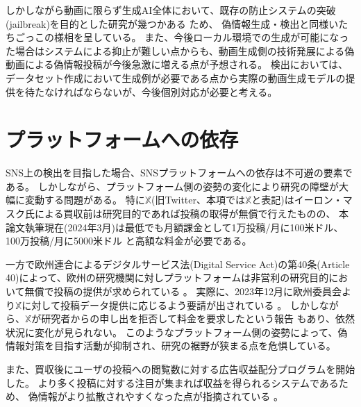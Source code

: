 しかしながら動画に限らず生成AI全体において、既存の防止システムの突破(jailbreak)を目的とした研究が幾つかある \cite{NEURIPS2023_fd661313,shayegani2024jailbreak}ため、
偽情報生成・検出と同様いたちごっこの様相を呈している。
また、今後ローカル環境での生成が可能になった場合はシステムによる抑止が難しい点からも、動画生成側の技術発展による偽動画による偽情報投稿が今後急激に増える点が予想される。
検出においては、データセット作成において生成例が必要である点から実際の動画生成モデルの提供を待たなければならないが、今後個別対応が必要と考える。

\section{プラットフォームへの依存}
SNS上の検出を目指した場合、SNSプラットフォームへの依存は不可避の要素である。
しかしながら、プラットフォーム側の姿勢の変化により研究の障壁が大幅に変動する問題がある。
特に$\mathbb{X}$(旧Twitter、本項では$\mathbb{X}$と表記)はイーロン・マスク氏による買収前は研究目的であれば投稿の取得が無償で行えたものの、
本論文執筆現在(2024年3月)は最低でも月額課金として1万投稿/月に100米ドル、100万投稿/月に5000米ドル \cite{Twitter}と高額な料金が必要である。

一方で欧州連合によるデジタルサービス法(Digital Service Act)の第40条(Article 40)によって、欧州の研究機関に対しプラットフォームは非営利の研究目的において無償で投稿の提供が求められている \cite{DSA}。
実際に、2023年12月に欧州委員会より$\mathbb{X}$に対して投稿データ提供に応じるよう要請が出されている \cite{order23}。
しかしながら、$\mathbb{X}$が研究者からの申し出を拒否して料金を要求したという報告 \cite{xreject}もあり、依然状況に変化が見られない。
このようなプラットフォーム側の姿勢によって、偽情報対策を目指す活動が抑制され、研究の裾野が狭まる点を危惧している。

また、買収後にユーザの投稿への閲覧数に対する広告収益配分プログラムを開始した。
より多く投稿に対する注目が集まれば収益を得られるシステムであるため、
偽情報がより拡散されやすくなった点が指摘されている \cite{Davis_2023}。